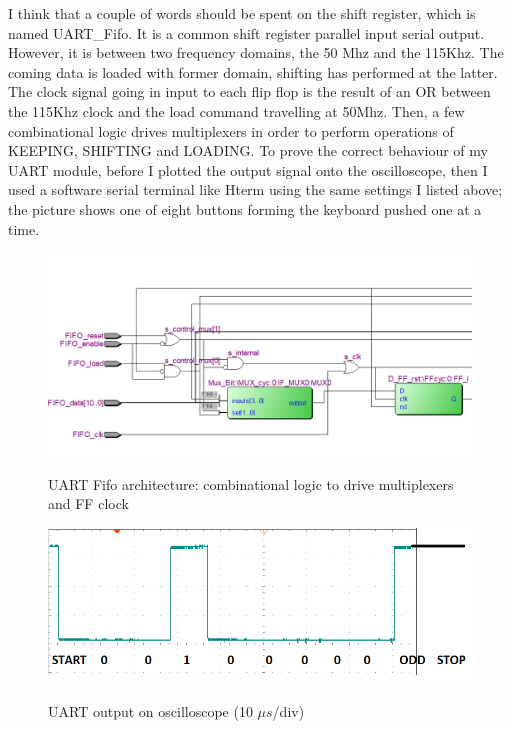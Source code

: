 I think that a couple of words should be spent on the shift register, which is named UART\_Fifo. It is a common shift register parallel input serial output. However, it is between two frequency domains, the 50 Mhz and the 115Khz. The coming data is loaded with former domain, shifting has performed at the latter. The clock signal going in input to each flip flop is the result of an OR between the 115Khz clock and the load command travelling at 50Mhz. Then, a few combinational logic drives multiplexers in order to perform operations of KEEPING, SHIFTING and LOADING.
\newline
\newline
To prove the correct behaviour of my UART module, before I plotted the output signal onto the oscilloscope, then I used a software serial terminal like Hterm using the same settings I listed above; the picture shows one of eight buttons forming the keyboard pushed one at a time.

\begin{figure}[H]
\centering
\includegraphics[scale=.7]{Immagini/23}
\label{23}
\caption{UART Fifo architecture: combinational logic to drive multiplexers and FF clock}
\end{figure}

\begin{figure}[H]
\centering
\includegraphics[scale=.9]{Immagini/21}
\label{21}
\caption{UART output on oscilloscope (10 $\mu s$/div)}
\end{figure}

